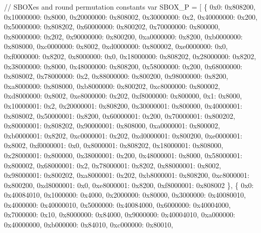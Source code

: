 \begin{DoxyCodeInclude}
    \textcolor{comment}{// SBOXes and round permutation constants}
    var SBOX\_P = [
        \{
            0x0: 0x808200,
            0x10000000: 0x8000,
            0x20000000: 0x808002,
            0x30000000: 0x2,
            0x40000000: 0x200,
            0x50000000: 0x808202,
            0x60000000: 0x800202,
            0x70000000: 0x800000,
            0x80000000: 0x202,
            0x90000000: 0x800200,
            0xa0000000: 0x8200,
            0xb0000000: 0x808000,
            0xc0000000: 0x8002,
            0xd0000000: 0x800002,
            0xe0000000: 0x0,
            0xf0000000: 0x8202,
            0x8000000: 0x0,
            0x18000000: 0x808202,
            0x28000000: 0x8202,
            0x38000000: 0x8000,
            0x48000000: 0x808200,
            0x58000000: 0x200,
            0x68000000: 0x808002,
            0x78000000: 0x2,
            0x88000000: 0x800200,
            0x98000000: 0x8200,
            0xa8000000: 0x808000,
            0xb8000000: 0x800202,
            0xc8000000: 0x800002,
            0xd8000000: 0x8002,
            0xe8000000: 0x202,
            0xf8000000: 0x800000,
            0x1: 0x8000,
            0x10000001: 0x2,
            0x20000001: 0x808200,
            0x30000001: 0x800000,
            0x40000001: 0x808002,
            0x50000001: 0x8200,
            0x60000001: 0x200,
            0x70000001: 0x800202,
            0x80000001: 0x808202,
            0x90000001: 0x808000,
            0xa0000001: 0x800002,
            0xb0000001: 0x8202,
            0xc0000001: 0x202,
            0xd0000001: 0x800200,
            0xe0000001: 0x8002,
            0xf0000001: 0x0,
            0x8000001: 0x808202,
            0x18000001: 0x808000,
            0x28000001: 0x800000,
            0x38000001: 0x200,
            0x48000001: 0x8000,
            0x58000001: 0x800002,
            0x68000001: 0x2,
            0x78000001: 0x8202,
            0x88000001: 0x8002,
            0x98000001: 0x800202,
            0xa8000001: 0x202,
            0xb8000001: 0x808200,
            0xc8000001: 0x800200,
            0xd8000001: 0x0,
            0xe8000001: 0x8200,
            0xf8000001: 0x808002
        \},
        \{
            0x0: 0x40084010,
            0x1000000: 0x4000,
            0x2000000: 0x80000,
            0x3000000: 0x40080010,
            0x4000000: 0x40000010,
            0x5000000: 0x40084000,
            0x6000000: 0x40004000,
            0x7000000: 0x10,
            0x8000000: 0x84000,
            0x9000000: 0x40004010,
            0xa000000: 0x40000000,
            0xb000000: 0x84010,
            0xc000000: 0x80010,

\end{DoxyCodeInclude}
